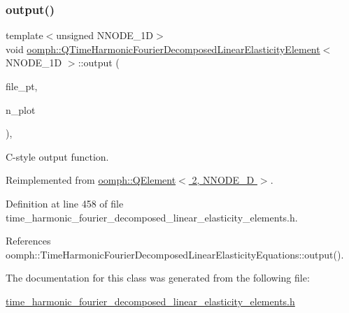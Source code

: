 \subsubsection{\texorpdfstring{output()}{output()}\hspace{0.1cm}{\footnotesize\ttfamily [4/4]}}
{\footnotesize\ttfamily template$<$unsigned N\+N\+O\+D\+E\+\_\+1D$>$ \\
void \hyperlink{classoomph_1_1QTimeHarmonicFourierDecomposedLinearElasticityElement}{oomph\+::\+Q\+Time\+Harmonic\+Fourier\+Decomposed\+Linear\+Elasticity\+Element}$<$ N\+N\+O\+D\+E\+\_\+1D $>$\+::output (\begin{DoxyParamCaption}\item[{F\+I\+LE $\ast$}]{file\+\_\+pt,  }\item[{const unsigned \&}]{n\+\_\+plot }\end{DoxyParamCaption})\hspace{0.3cm}{\ttfamily [inline]}, {\ttfamily [virtual]}}



C-\/style output function. 



Reimplemented from \hyperlink{classoomph_1_1QElement_3_012_00_01NNODE__1D_01_4_aeaa407209398e3c0daf6968520d774ec}{oomph\+::\+Q\+Element$<$ 2, N\+N\+O\+D\+E\+\_\+D $>$}.



Definition at line 458 of file time\+\_\+harmonic\+\_\+fourier\+\_\+decomposed\+\_\+linear\+\_\+elasticity\+\_\+elements.\+h.



References oomph\+::\+Time\+Harmonic\+Fourier\+Decomposed\+Linear\+Elasticity\+Equations\+::output().



The documentation for this class was generated from the following file\+:\begin{DoxyCompactItemize}
\item 
\hyperlink{time__harmonic__fourier__decomposed__linear__elasticity__elements_8h}{time\+\_\+harmonic\+\_\+fourier\+\_\+decomposed\+\_\+linear\+\_\+elasticity\+\_\+elements.\+h}\end{DoxyCompactItemize}

